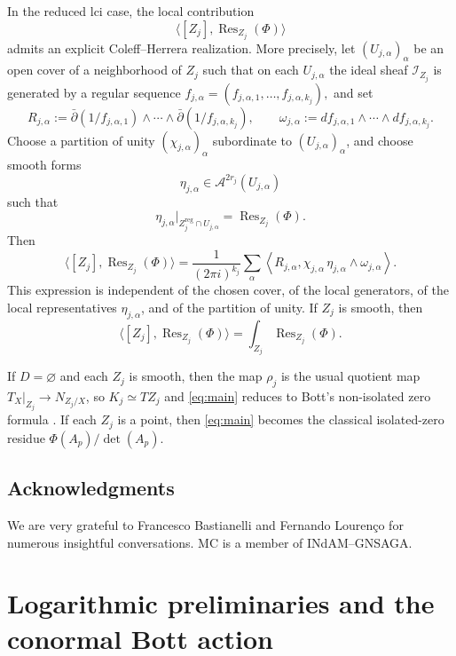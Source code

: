 \documentclass[12pt,a4paper,dvipsnames,x11names]{amsart}
\numberwithin{equation}{section}
\theoremstyle{plain}
\theoremstyle{definition}
\theoremstyle{remark}
\newcommand{\reg}{\mathrm{reg}}
\begin{document}
In the reduced lci case, the local contribution
$$
\langle [Z_j],\operatorname{Res}_{Z_j}(\Phi)\rangle
$$
admits an explicit Coleff--Herrera realization. More precisely, let $(U_{j,\alpha})_\alpha$ be an open cover of a neighborhood of $Z_j$ such that on each $U_{j,\alpha}$ the ideal sheaf $\mathcal I_{Z_j}$ is generated by a regular sequence
$
f_{j,\alpha}=(f_{j,\alpha,1},\dots,f_{j,\alpha,k_j}),
$
and set
$$
R_{j,\alpha}
:=
\bar\partial(1/f_{j,\alpha,1})\wedge\cdots\wedge \bar\partial(1/f_{j,\alpha,k_j}),
\qquad
\omega_{j,\alpha}
:=
df_{j,\alpha,1}\wedge\cdots\wedge df_{j,\alpha,k_j}.
$$
Choose a partition of unity $(\chi_{j,\alpha})_\alpha$ subordinate to $(U_{j,\alpha})_\alpha$, and choose smooth forms
$$
\eta_{j,\alpha}\in \mathscr A^{2r_j}(U_{j,\alpha})
$$
such that
$$
\eta_{j,\alpha}|_{Z_j^{\reg}\cap U_{j,\alpha}}
=
\operatorname{Res}_{Z_j}(\Phi).
$$
Then
\begin{equation}\label{eq:main-CH}
\langle [Z_j],\operatorname{Res}_{Z_j}(\Phi)\rangle
=
\frac{1}{(2\pi i)^{k_j}}
\sum_\alpha
\left\langle
R_{j,\alpha},
\chi_{j,\alpha}\,\eta_{j,\alpha}\wedge \omega_{j,\alpha}
\right\rangle.
\end{equation}
This expression is independent of the chosen cover, of the local generators, of the local representatives $\eta_{j,\alpha}$, and of the partition of unity. If $Z_j$ is smooth, then
\begin{equation}\label{eq:main-smooth}
\langle [Z_j],\operatorname{Res}_{Z_j}(\Phi)\rangle
=
\int_{Z_j}\operatorname{Res}_{Z_j}(\Phi).
\end{equation}
 
If $D=\varnothing$ and each $Z_j$ is smooth, then the map $\rho_j$ is the usual quotient map $T_X|_{Z_j}\to N_{Z_j/X}$, so $K_j\simeq T Z_j$ and \eqref{eq:main} reduces to Bott's non-isolated zero formula \cite{Bott67a,Bott67b,BottTu,SuwaBook}. If each $Z_j$ is a point, then \eqref{eq:main} becomes the classical isolated-zero residue $\Phi(A_p)/\det(A_p)$.
 

\subsection*{Acknowledgments}
We are very grateful to Francesco Bastianelli and Fernando Louren\c co for numerous insightful conversations.  MC is a member of INdAM--GNSAGA. 



\section{Logarithmic preliminaries and the conormal Bott action}\label{sec:logtangent}
\end{document}
